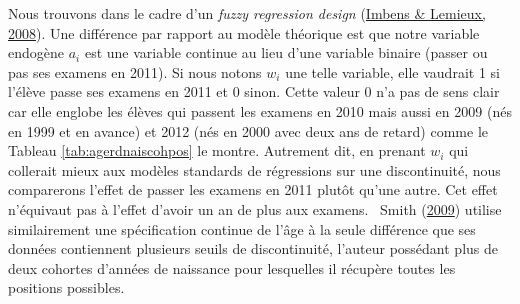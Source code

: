 \documentclass[
]{book}
\begin{document}
Nous trouvons dans le cadre d'un \emph{fuzzy regression design} (\protect\hyperlink{ref-IMB:LEM:08}{Imbens \& Lemieux, 2008}). Une différence par rapport au modèle théorique est que notre variable endogène \(a_i\) est une variable continue au lieu d'une variable binaire (passer ou pas ses examens en 2011). Si nous notons \(w_i\) une telle variable, elle vaudrait 1 si l'élève passe ses examens en 2011 et 0 sinon. Cette valeur 0 n'a pas de sens clair car elle englobe les élèves qui passent les examens en 2010 mais aussi en 2009 (nés en 1999 et en avance) et 2012 (nés en 2000 avec deux ans de retard) comme le Tableau \ref{tab:agerdnaiscohpos} le montre. Autrement dit, en prenant \(w_i\) qui collerait mieux aux modèles standards de régressions sur une discontinuité, nous comparerons l'effet de passer les examens en 2011 plutôt qu'une autre. Cet effet n'équivaut pas à l'effet d'avoir un an de plus aux examens.~
Smith (\protect\hyperlink{ref-SMI:09}{2009}) utilise similairement une spécification continue de l'âge à la seule différence que ses données contiennent plusieurs seuils de discontinuité, l'auteur possédant plus de deux cohortes d'années de naissance pour lesquelles il récupère toutes les positions possibles.
\end{document}
